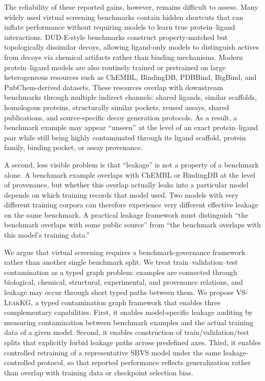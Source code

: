 \documentclass[11pt]{article}
\begin{document}
The reliability of these reported gains, however, remains difficult to assess. Many widely used virtual screening benchmarks contain hidden shortcuts that can inflate performance without requiring models to learn true protein--ligand interactions. DUD-E-style benchmarks construct property-matched but topologically dissimilar decoys, allowing ligand-only models to distinguish actives from decoys via chemical artifacts rather than binding mechanisms. Modern protein--ligand models are also routinely trained or pretrained on large heterogeneous resources such as ChEMBL, BindingDB, PDBBind, BigBind, and PubChem-derived datasets. These resources overlap with downstream benchmarks through multiple indirect channels: shared ligands, similar scaffolds, homologous proteins, structurally similar pockets, reused assays, shared publications, and source-specific decoy generation protocols. As a result, a benchmark example may appear ``unseen'' at the level of an exact protein--ligand pair while still being highly contaminated through its ligand scaffold, protein family, binding pocket, or assay provenance.

A second, less visible problem is that ``leakage'' is not a property of a benchmark alone. A benchmark example overlaps with ChEMBL or BindingDB at the level of provenance, but whether this overlap actually leaks into a particular model depends on which training records that model used. Two models with very different training corpora can therefore experience very different effective leakage on the same benchmark. A practical leakage framework must distinguish ``the benchmark overlaps with some public source'' from ``the benchmark overlaps with this model's training data.''

We argue that virtual screening requires a benchmark-governance framework rather than another single benchmark split. We treat train--validation--test contamination as a typed graph problem: examples are connected through biological, chemical, structural, experimental, and provenance relations, and leakage may occur through short typed paths between them. We propose \textsc{VS-LeakKG}, a typed contamination graph framework that enables three complementary capabilities. First, it enables model-specific leakage auditing by measuring contamination between benchmark examples and the actual training data of a given model. Second, it enables construction of train/validation/test splits that explicitly forbid leakage paths across predefined axes. Third, it enables controlled retraining of a representative SBVS model under the same leakage-controlled protocol, so that reported performance reflects generalization rather than overlap with training data or checkpoint selection bias.
\end{document}
